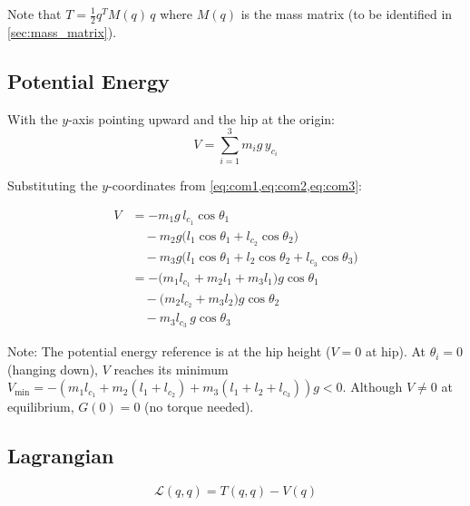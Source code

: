 \documentclass[11pt,a4paper]{article}
\newcommand{\vc}[1]{\bm{#1}}
\newcommand{\mat}[1]{\bm{#1}}
\newcommand{\dt}[1]{\dot{#1}}
\def\vc#1{#1}%
\def\mat#1{#1}%
\def\dt#1{#1}%
\def\bm#1{#1}%
\begin{document}
Note that $T = \frac{1}{2} \dt{\vc{q}}^T \mat{M}(\vc{q}) \, \dt{\vc{q}}$
where $\mat{M}(\vc{q})$ is the mass matrix (to be identified in \cref{sec:mass_matrix}).

\subsection{Potential Energy}

With the $y$-axis pointing upward and the hip at the origin:
\begin{equation}
    V = \sum_{i=1}^{3} m_i g \, y_{c_i}
    \label{eq:potential_general}
\end{equation}

Substituting the $y$-coordinates from \cref{eq:com1,eq:com2,eq:com3}:

\begin{resultbox}
\begin{align}
    V &= -m_1 g \, l_{c_1} \cos\theta_1 \nonumber \\
      &\quad - m_2 g \bigl(l_1 \cos\theta_1 + l_{c_2} \cos\theta_2\bigr) \nonumber \\
      &\quad - m_3 g \bigl(l_1 \cos\theta_1 + l_2 \cos\theta_2 + l_{c_3} \cos\theta_3\bigr) \nonumber \\[6pt]
      &= -\bigl(m_1 l_{c_1} + m_2 l_1 + m_3 l_1\bigr) g \cos\theta_1 \nonumber \\
      &\quad -\bigl(m_2 l_{c_2} + m_3 l_2\bigr) g \cos\theta_2 \nonumber \\
      &\quad - m_3 l_{c_3} \, g \cos\theta_3
    \label{eq:potential_expanded}
\end{align}
\end{resultbox}

Note: The potential energy reference is at the hip height ($V=0$ at hip).
At $\theta_i = 0$ (hanging down), $V$ reaches its minimum
$V_{\min} = -(m_1 l_{c_1} + m_2(l_1+l_{c_2}) + m_3(l_1+l_2+l_{c_3}))g < 0$.
Although $V \neq 0$ at equilibrium, $\vc{G}(\vc{0}) = \vc{0}$ (no torque needed).

\subsection{Lagrangian}

\begin{equation}
    \mathcal{L}(\vc{q}, \dt{\vc{q}}) = T(\vc{q}, \dt{\vc{q}}) - V(\vc{q})
    \label{eq:lagrangian}
\end{equation}
\end{document}

